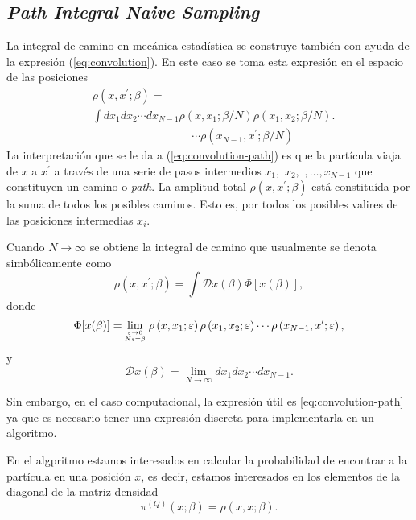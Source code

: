 \documentclass[%
 reprint,
 amsmath,amssymb,
 aps,
 pra,
]{revtex4-2}
\begin{document}
\subsection{\textit{Path Integral Naive Sampling}\label{subsec:PathInt}} 
La integral de camino en mecánica estadística se construye también con ayuda de la expresión (\ref{eq:convolution}). En este caso se toma esta expresión en el espacio de las posiciones
\begin{align}
	& \rho (x, x^{\prime}; \beta) = \nonumber \\
	& \int dx_1 dx_2 \cdots dx_{N-1} \rho (x,x_1; \beta/N) \rho (x_1,x_2; \beta/N). \nonumber \\
	& \,\,\,\,\,\,\,\,\,\,\,\,\,\,\,\,\,\,\,\,\,\,\,\,\,\,\,\,\,\,\,\,\,\,\,\,\,\,\,\,\,\,\,\,\,\,\,\,\,\,\,\,\, \cdots \rho (x_{N-1},x^{\prime}; \beta/N) \label{eq:convolution-path}
\end{align}
La interpretación que se le da a (\ref{eq:convolution-path}) es que la partícula viaja de $x$ a $x^\prime$ a través de una serie de pasos intermedios $x_1,\,\,x_2,\,\,, \dots, x_{N-1}$ que constituyen un camino o \textit{path}. La amplitud total $\rho (x, x^{\prime}; \beta)$ está constituída por la suma de todos los posibles caminos. Esto es, por todos los posibles valires de las posiciones intermedias $x_i$.

Cuando $N\rightarrow\infty$ se obtiene la integral de camino que usualmente se denota simbólicamente como
\begin{equation}
	\rho\left(x, x^{\prime} ; \beta \right) = \int \mathscr{ D } x(\beta) \Phi[x(\beta)], \label{eq:path-integral-formulation}
\end{equation}
donde
\begin{equation}
	\Phi[x(\beta)]=\!\lim _{\varepsilon \rightarrow 0 \atop N \varepsilon=\beta} \rho\left(x, x_{1} ; \varepsilon\right) \rho\left(x_{1}, x_{2} ; \varepsilon\right) \cdots \rho\left(x_{N-1}, x^{\prime} ; \varepsilon\right),
\end{equation}
y 
\begin{equation}
	\mathscr{D} x(\beta)=\lim _{N \rightarrow \infty} d x_{1} d x_{2} \cdots d x_{N-1}.
\end{equation}

Sin embargo, en el caso computacional, la expresión útil es \ref{eq:convolution-path} ya que es necesario tener una expresión discreta para implementarla en un algoritmo.

En el algpritmo estamos interesados en calcular la probabilidad de encontrar a la partícula en una posición $x$, es decir, estamos interesados en los elementos de la diagonal de la matriz densidad
\begin{equation}
	\pi^{(Q)}(x;\beta) = \rho\left(x, x ; \beta \right). \label{eq:pi-x}
\end{equation}
\end{document}
